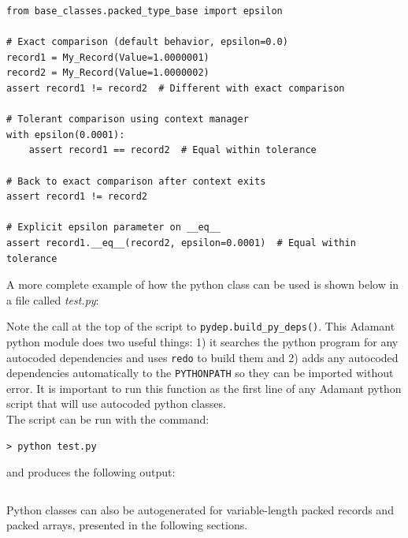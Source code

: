 \vspace{5mm} %
\begin{verbatim}
from base_classes.packed_type_base import epsilon

# Exact comparison (default behavior, epsilon=0.0)
record1 = My_Record(Value=1.0000001)
record2 = My_Record(Value=1.0000002)
assert record1 != record2  # Different with exact comparison

# Tolerant comparison using context manager
with epsilon(0.0001):
    assert record1 == record2  # Equal within tolerance

# Back to exact comparison after context exits
assert record1 != record2

# Explicit epsilon parameter on __eq__
assert record1.__eq__(record2, epsilon=0.0001)  # Equal within tolerance
\end{verbatim}
\vspace{5mm} %

A more complete example of how the python class can be used is shown below in a file called \textit{test.py}:


Note the call at the top of the script to \texttt{pydep.build\_py\_deps()}. This Adamant python module does two useful things: 1) it searches the python program for any autocoded dependencies and uses \texttt{redo} to build them and 2) adds any autocoded dependencies automatically to the \texttt{PYTHONPATH} so they can be imported without error. It is important to run this function as the first line of any Adamant python script that will use autocoded python classes. \\

The script can be run with the command:

\vspace{5mm} %
\begin{verbatim}
> python test.py
\end{verbatim}
\vspace{5mm} %

and produces the following output:

\vspace{5mm} %
\inputminted{text}{../example_architecture/record_py/output.txt}
\vspace{5mm} %

Python classes can also be autogenerated for variable-length packed records and packed arrays, presented in the following sections.

